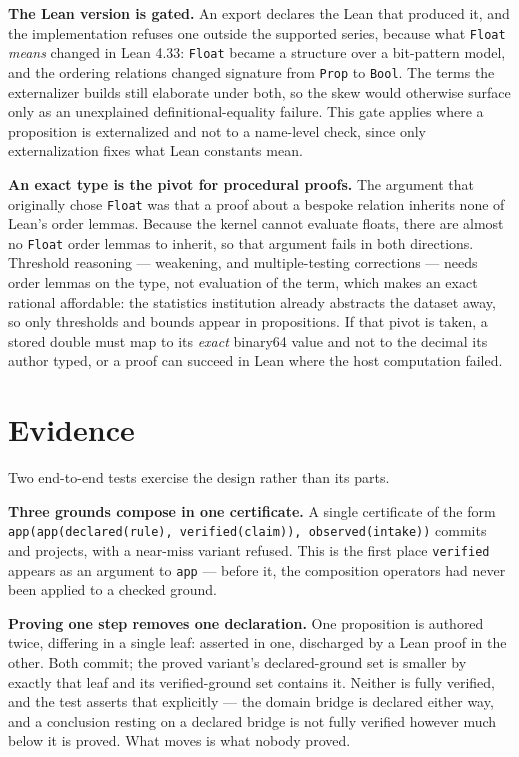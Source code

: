 \documentclass[manuscript,nonacm=true]{acmart}
\newcommand{\code}[1]{\texttt{\small #1}}
\newcommand{\Prop}{\code{Prop}}
\newcommand{\cl}[1]{\textbf{#1}}
\begin{document}
\cl{The Lean version is gated.} An export declares the Lean that produced it, and the implementation refuses one outside the supported series, because what \code{Float} \emph{means} changed in Lean 4.33: \code{Float} became a structure over a bit-pattern model, and the ordering relations changed signature from \Prop{} to \code{Bool}. The terms the externalizer builds still elaborate under both, so the skew would otherwise surface only as an unexplained definitional-equality failure. This gate applies where a proposition is externalized and not to a name-level check, since only externalization fixes what Lean constants mean.

\cl{An exact type is the pivot for procedural proofs.} The argument that originally chose \code{Float} was that a proof about a bespoke relation inherits none of Lean's order lemmas. Because the kernel cannot evaluate floats, there are almost no \code{Float} order lemmas to inherit, so that argument fails in both directions. Threshold reasoning --- weakening, and multiple-testing corrections --- needs order lemmas on the type, not evaluation of the term, which makes an exact rational affordable: the statistics institution already abstracts the dataset away, so only thresholds and bounds appear in propositions. If that pivot is taken, a stored double must map to its \emph{exact} binary64 value and not to the decimal its author typed, or a proof can succeed in Lean where the host computation failed.

\section{Evidence}

Two end-to-end tests exercise the design rather than its parts.

\cl{Three grounds compose in one certificate.} A single certificate of the form \code{app(app(declared(rule), verified(claim)), observed(intake))} commits and projects, with a near-miss variant refused. This is the first place \code{verified} appears as an argument to \code{app} --- before it, the composition operators had never been applied to a checked ground.

\cl{Proving one step removes one declaration.} One proposition is authored twice, differing in a single leaf: asserted in one, discharged by a Lean proof in the other. Both commit; the proved variant's declared-ground set is smaller by exactly that leaf and its verified-ground set contains it. Neither is fully verified, and the test asserts that explicitly --- the domain bridge is declared either way, and a conclusion resting on a declared bridge is not fully verified however much below it is proved. What moves is what nobody proved.
\end{document}
